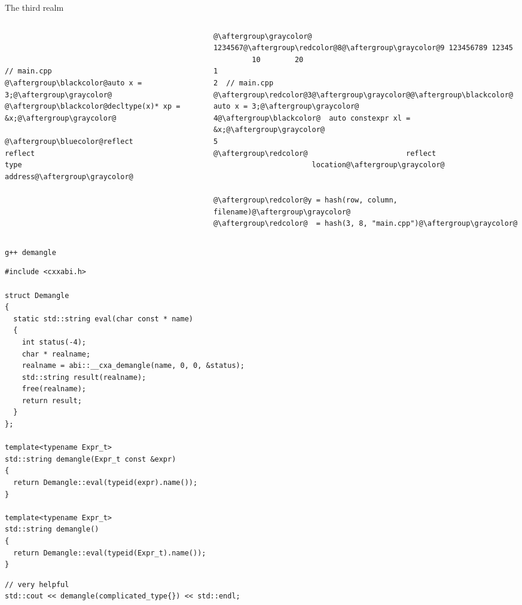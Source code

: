 \documentclass[xcolor=dvipsnames]{beamer}
\begin{document}
\begin{frame}[fragile]{The third realm}
  \begin{columns}[T] %
    \begin{column}{0.47\textwidth}
  \begin{lstlisting}



// main.cpp
@\aftergroup\blackcolor@auto x = 3;@\aftergroup\graycolor@
@\aftergroup\blackcolor@decltype(x)* xp = &x;@\aftergroup\graycolor@

@\aftergroup\bluecolor@reflect           reflect
type              address@\aftergroup\graycolor@
  \end{lstlisting}
    \end{column}%
    \hfill%
    \begin{column}{0.53\textwidth}
 \begin{lstlisting}
@\aftergroup\graycolor@ 1234567@\aftergroup\redcolor@8@\aftergroup\graycolor@9 123456789 12345
         10        20
1
2  // main.cpp
@\aftergroup\redcolor@3@\aftergroup\graycolor@@\aftergroup\blackcolor@  auto x = 3;@\aftergroup\graycolor@
4@\aftergroup\blackcolor@  auto constexpr xl = &x;@\aftergroup\graycolor@
5
@\aftergroup\redcolor@                       reflect
                       location@\aftergroup\graycolor@


@\aftergroup\redcolor@y = hash(row, column, filename)@\aftergroup\graycolor@
@\aftergroup\redcolor@  = hash(3, 8, "main.cpp")@\aftergroup\graycolor@

 \end{lstlisting}
    \end{column}%
  \end{columns}
\end{frame}


\begin{frame}[fragile]{\texttt{g++ demangle}}
\begin{lstlisting}[basicstyle=\tiny\ttfamily]
#include <cxxabi.h>

struct Demangle
{
  static std::string eval(char const * name)
  {
    int status(-4);
    char * realname;
    realname = abi::__cxa_demangle(name, 0, 0, &status);
    std::string result(realname);
    free(realname);
    return result;
  }
};

template<typename Expr_t>
std::string demangle(Expr_t const &expr)
{
  return Demangle::eval(typeid(expr).name());
}

template<typename Expr_t>
std::string demangle()
{
  return Demangle::eval(typeid(Expr_t).name());
}
\end{lstlisting}

\begin{lstlisting}[basicstyle=\tiny\ttfamily]
// very helpful
std::cout << demangle(complicated_type{}) << std::endl;
\end{lstlisting}
\end{frame}


\begin{frame}[plain]
  \titlepage
\end{frame}
\end{document}
